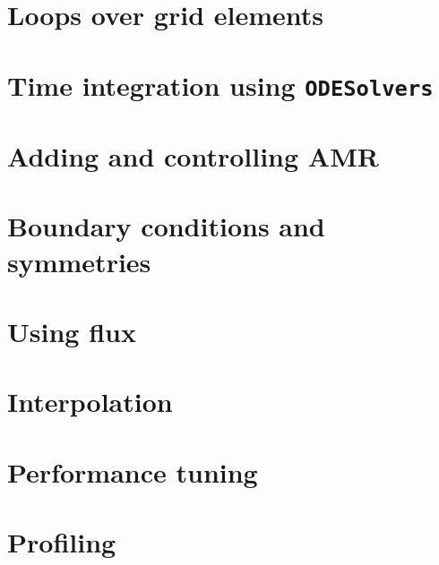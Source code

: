 \section{Loops over grid elements}
\label{sec:loops}


\section{Time integration using \texttt{ODESolvers}}
\label{sec:odesolvers}


\section{Adding and controlling AMR}
\label{sec:amr}


\section{Boundary conditions and symmetries}
\label{sec:bcs}


\section{Using flux}
\label{sec:flux}

\section{Interpolation}
\label{sec:interpolation}

\section{Performance tuning}
\label{sec:perf_tuning}


\section{Profiling}
\label{sec:profiling}

